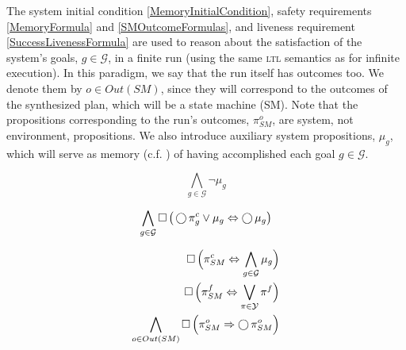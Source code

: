The system initial condition \eqref{MemoryInitialCondition}, safety requirements \eqref{MemoryFormula} and \eqref{SMOutcomeFormulas}, and liveness requirement \eqref{SuccessLivenessFormula} are used to reason about the satisfaction of the system's goals, $g \in \mathcal{G}$, in a finite run (using the same \textsc{ltl} semantics as for infinite execution).
In this paradigm, we say that the run itself has outcomes too.
We denote them by $o \in Out(SM)$, since they will correspond to the outcomes of the synthesized plan, which will be a state machine (SM).
Note that the propositions corresponding to the run's outcomes, $\pi_{SM}^o$, are system, not environment, propositions.
We also introduce auxiliary system propositions, $\mu_g$, which will serve as memory (c.f. \cite{Vasu2012IROS}) of having accomplished each goal $g \in \mathcal{G}$.

\begin{equation}\label{MemoryInitialCondition}
	\bigwedge \limits_{g \in \mathcal{G}} \lnot \mu_g 
\end{equation}


\begin{equation}\label{MemoryFormula}
	\bigwedge \limits_{g \in \mathcal{G}} \operatorname{\Box} \big( \operatorname{\bigcirc} \pi_g^c \vee \mu_g \Leftrightarrow \operatorname{\bigcirc} \mu_g \big)
\end{equation}

\begin{subequations}
	\label{SMOutcomeFormulas}
	\begin{align}
		\operatorname{\Box} \Big( \pi_{SM}^{c} \Leftrightarrow \bigwedge \limits_{g \in \mathcal{G}} \mu_g \Big) \label{SuccessfulOutcomeFormula}\\
		\operatorname{\Box} \Big( \pi_{SM}^{f} \Leftrightarrow \bigvee \limits_{\pi \in \mathcal{Y}} \pi^f \Big) \label{FailedOutcomeFormula}\\
		\bigwedge \limits_{o \in Out(SM)} \operatorname{\Box} \Big( \pi_{SM}^{o} \Rightarrow \operatorname{\bigcirc} \pi_{SM}^{o} \Big) \label{SMOutcomePersistenceFormula}
	\end{align}
\end{subequations}

